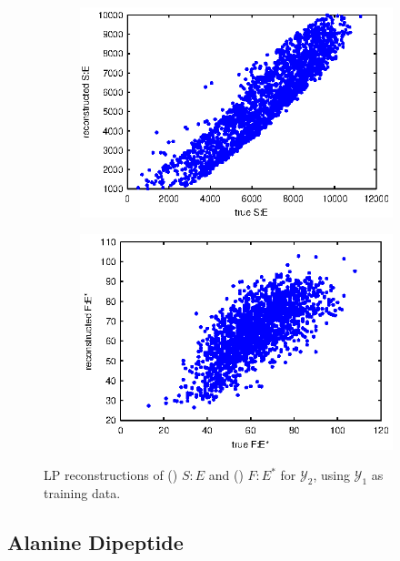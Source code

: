\begin{figure}[t]
\centering
\begin{subfigure}{0.4\textwidth}
\includegraphics[width=\textwidth]{rxn_recon4}
\caption{}
\label{subfig:rxn_recon1}
\end{subfigure}
\begin{subfigure}{0.4\textwidth}
\includegraphics[width=\textwidth]{rxn_recon6}
\caption{}
\label{subfig:rxn_recon2}
\end{subfigure}
    \caption[Laplacian Pyramids reconstructions for chemical reaction network data]{LP reconstructions of () $S:E$ and () $F:E^{*}$ for $\mathcal{Y}_2$, using $\mathcal{Y}_1$ as training data.}
    \label{fig:rxn_recon}
\end{figure}

\subsection{Alanine Dipeptide}

